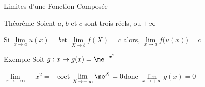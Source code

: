\documentclass{cours}
\begin{document}
    \begin{Gpartie}{Limites d'une Fonction Composée} 
        \begin{Spartie}{Théorème} 
            Soient $a$, $b$ et $c$ sont trois réels, ou $\pm\infty$

            Si \qquad$\lim\limits_{x\to a}u(x)=b$\qquad et \qquad $\lim\limits_{X\to b}f(X)=c$ \qquad alors, \qquad $\lim\limits_{x\to a}f\big(u(x)\big)=c$
        \end{Spartie}
        \begin{Spartie}{Exemple} 
            Soit $g:x\mapsto g(x)=\me^{-x^2}$

            $\lim\limits_{x\to +\infty} -x^2=-\infty$\qquad et \qquad$\lim\limits_{X\to -\infty} \me^X=0$\qquad donc \qquad$\lim\limits_{x\to +\infty}g(x)=0$
        \end{Spartie}
    \end{Gpartie}
\end{document}
